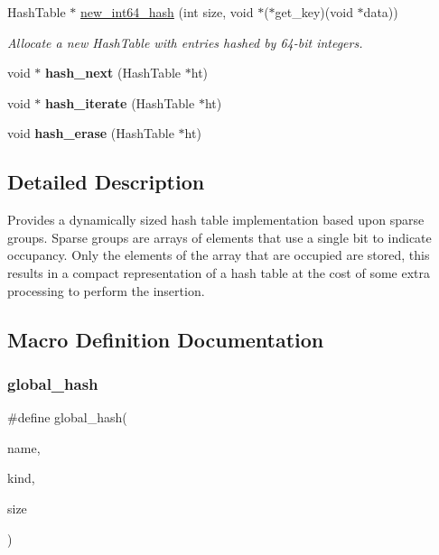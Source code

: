 \begin{DoxyCompactItemize}
Hash\+Table $\ast$ \hyperlink{group__hash_gab2457c4ed3f2950ebdf12411d23d22ce}{new\+\_\+int64\+\_\+hash} (int size, void $\ast$($\ast$get\+\_\+key)(void $\ast$data))
\begin{DoxyCompactList}\small\item\em Allocate a new Hash\+Table with entries hashed by 64-\/bit integers. \end{DoxyCompactList}\item 
\mbox{\label{group__hash_gadfbdabf4e66f70f6c9f3cb3844d2e2cd}} 
void $\ast$ {\bfseries hash\+\_\+next} (Hash\+Table $\ast$ht)
\item 
\mbox{\label{group__hash_ga103aae1052ca8c86980bceeda8ab09d3}} 
void $\ast$ {\bfseries hash\+\_\+iterate} (Hash\+Table $\ast$ht)
\item 
\mbox{\label{group__hash_ga73997244cca796594b2805e6a954cad2}} 
void {\bfseries hash\+\_\+erase} (Hash\+Table $\ast$ht)
\end{DoxyCompactItemize}


\subsection{Detailed Description}
Provides a dynamically sized hash table implementation based upon sparse groups. Sparse groups are arrays of elements that use a single bit to indicate occupancy. Only the elements of the array that are occupied are stored, this results in a compact representation of a hash table at the cost of some extra processing to perform the insertion. 

\subsection{Macro Definition Documentation}
\mbox{\label{group__hash_gadf905560217c8abc03d84eded54180e6}} 
\subsubsection{\texorpdfstring{global\+\_\+hash}{global\_hash}}
{\footnotesize\ttfamily \#define global\+\_\+hash(\begin{DoxyParamCaption}\item[{}]{name,  }\item[{}]{kind,  }\item[{}]{size }\end{DoxyParamCaption})}


